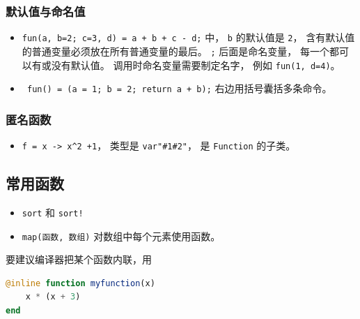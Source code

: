 \subsubsection{默认值与命名值}
\begin{itemize}
\item \verb`fun(a, b=2; c=3, d) = a + b + c - d;` 中， \verb`b` 的默认值是 \verb`2`， 含有默认值的普通变量必须放在所有普通变量的最后。 \verb`;` 后面是命名变量， 每一个都可以有或没有默认值。 调用时命名变量需要制定名字， 例如 \verb`fun(1, d=4)`。
\item \verb` fun() = (a = 1; b = 2; return a + b);` 右边用括号囊括多条命令。
\end{itemize}

\subsubsection{匿名函数}
\begin{itemize}
\item \verb`f = x -> x^2 +1`， 类型是 \verb`var"#1#2"`， 是 \verb`Function` 的子类。
\end{itemize}

\subsection{常用函数}
\begin{itemize}
\item \verb`sort` 和 \verb`sort!`
\item \verb`map(函数, 数组)` 对数组中每个元素使用函数。
\end{itemize}

要建议编译器把某个函数内联，用
\begin{lstlisting}[language=julia]
@inline function myfunction(x)
    x * (x + 3)
end
\end{lstlisting}
